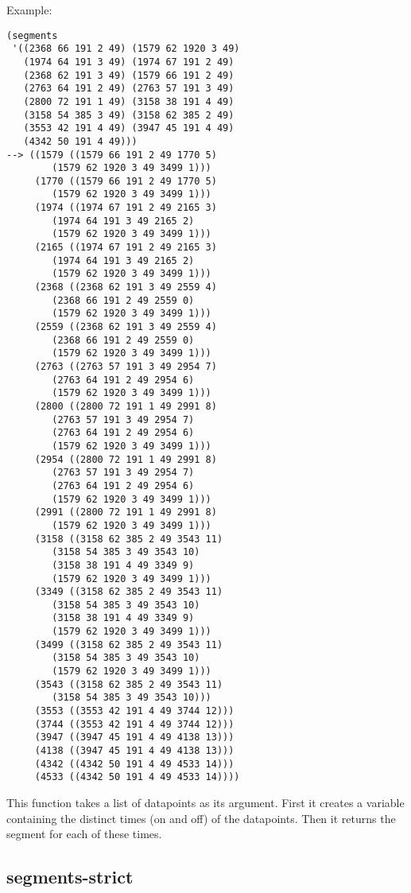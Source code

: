\vspace{0.5cm}
\noindent Example:
\begin{verbatim}
(segments
 '((2368 66 191 2 49) (1579 62 1920 3 49)
   (1974 64 191 3 49) (1974 67 191 2 49)
   (2368 62 191 3 49) (1579 66 191 2 49)
   (2763 64 191 2 49) (2763 57 191 3 49)
   (2800 72 191 1 49) (3158 38 191 4 49)
   (3158 54 385 3 49) (3158 62 385 2 49)
   (3553 42 191 4 49) (3947 45 191 4 49)
   (4342 50 191 4 49)))
--> ((1579 ((1579 66 191 2 49 1770 5)
	    (1579 62 1920 3 49 3499 1)))
     (1770 ((1579 66 191 2 49 1770 5)
	    (1579 62 1920 3 49 3499 1)))
     (1974 ((1974 67 191 2 49 2165 3)
	    (1974 64 191 3 49 2165 2)
	    (1579 62 1920 3 49 3499 1)))
     (2165 ((1974 67 191 2 49 2165 3)
	    (1974 64 191 3 49 2165 2)
	    (1579 62 1920 3 49 3499 1)))
     (2368 ((2368 62 191 3 49 2559 4)
	    (2368 66 191 2 49 2559 0)
	    (1579 62 1920 3 49 3499 1)))
     (2559 ((2368 62 191 3 49 2559 4)
	    (2368 66 191 2 49 2559 0)
	    (1579 62 1920 3 49 3499 1)))
     (2763 ((2763 57 191 3 49 2954 7)
	    (2763 64 191 2 49 2954 6)
	    (1579 62 1920 3 49 3499 1)))
     (2800 ((2800 72 191 1 49 2991 8)
	    (2763 57 191 3 49 2954 7)
	    (2763 64 191 2 49 2954 6)
	    (1579 62 1920 3 49 3499 1)))
     (2954 ((2800 72 191 1 49 2991 8)
	    (2763 57 191 3 49 2954 7)
	    (2763 64 191 2 49 2954 6)
	    (1579 62 1920 3 49 3499 1)))
     (2991 ((2800 72 191 1 49 2991 8)
	    (1579 62 1920 3 49 3499 1)))
     (3158 ((3158 62 385 2 49 3543 11)
	    (3158 54 385 3 49 3543 10)
	    (3158 38 191 4 49 3349 9)
	    (1579 62 1920 3 49 3499 1)))
     (3349 ((3158 62 385 2 49 3543 11)
	    (3158 54 385 3 49 3543 10)
	    (3158 38 191 4 49 3349 9)
	    (1579 62 1920 3 49 3499 1)))
     (3499 ((3158 62 385 2 49 3543 11)
	    (3158 54 385 3 49 3543 10)
	    (1579 62 1920 3 49 3499 1)))
     (3543 ((3158 62 385 2 49 3543 11)
	    (3158 54 385 3 49 3543 10)))
     (3553 ((3553 42 191 4 49 3744 12)))
     (3744 ((3553 42 191 4 49 3744 12)))
     (3947 ((3947 45 191 4 49 4138 13)))
     (4138 ((3947 45 191 4 49 4138 13)))
     (4342 ((4342 50 191 4 49 4533 14)))
     (4533 ((4342 50 191 4 49 4533 14))))
\end{verbatim}

\noindent This function takes a list of datapoints as
its argument. First it creates a variable containing
the distinct times (on and off) of the datapoints.
Then it returns the segment for each of these
times.


\subsection*{segments-strict}\label{fun:segments-strict}

